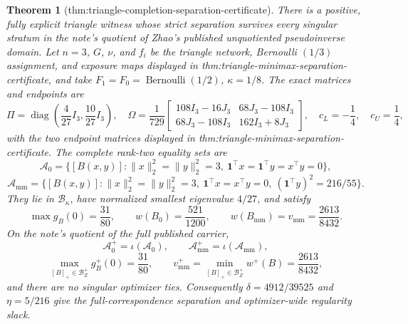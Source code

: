\documentclass{article}
\newtheorem{theorem}{Theorem}
\begin{document}
\begin{theorem}[thm:triangle-completion-separation-certificate]\label{thm:triangle-completion-separation-certificate}
There is a positive, fully explicit triangle witness whose strict separation survives every singular stratum in the note's quotient of Zhao's published unquotiented pseudoinverse domain.  Let \(n=3\), \(G\), \(\nu\), and \(f_i\) be the triangle network, Bernoulli \((1/3)\) assignment, and exposure maps displayed in thm:triangle-minimax-separation-certificate, and take \(F_1=F_0=\operatorname{Bernoulli}(1/2)\), \(\kappa=1/8\).  The exact matrices and endpoints are
\[
\Pi=\operatorname{diag}\!\left(\frac4{27}I_3,\frac{10}{27}I_3\right),
\quad
\Omega=\frac1{729}
\begin{bmatrix}108I_3-16J_3&68J_3-108I_3\\68J_3-108I_3&162I_3+8J_3\end{bmatrix},
\quad c_L=-\frac14,\quad c_U=\frac14,
\]
with the two endpoint matrices displayed in thm:triangle-minimax-separation-certificate.  The complete rank-two equality sets are
\[
\mathcal A_0=\{[B(x,y)]:\lVert x\rVert_2^2=\lVert y\rVert_2^2=3,
\ \mathbf1^\top x=\mathbf1^\top y=x^\top y=0\},
\]
\[
\mathcal A_{\mathrm{mm}}=\{[B(x,y)]:\lVert x\rVert_2^2=\lVert y\rVert_2^2=3,
\ \mathbf1^\top x=x^\top y=0,\ (\mathbf1^\top y)^2=216/55\}.
\]
They lie in \(\mathcal B_\kappa\), have normalized smallest eigenvalue \(4/27\), and satisfy
\[
\max g_B(0)=\frac{31}{80},
\qquad w(B_0)=\frac{521}{1200},
\qquad w(B_{\mathrm{mm}})=v_{\mathrm{mm}}=\frac{2613}{8432}.
\]
On the note's quotient of the full published carrier,
\[
\mathcal A_0^+=\iota(\mathcal A_0),
\qquad \mathcal A_{\mathrm{mm}}^+=\iota(\mathcal A_{\mathrm{mm}}),
\]
\[
\max_{[B]_+\in\mathcal B_Z^+}g_B^+(0)=\frac{31}{80},
\qquad v_{\mathrm{mm}}^+=\min_{[B]_+\in\mathcal B_Z^+}w^+(B)=\frac{2613}{8432},
\]
and there are no singular optimizer ties.  Consequently \(\delta=4912/39525\) and \(\eta=5/216\) give the full-correspondence separation and optimizer-wide regularity slack.
\end{theorem}
\end{document}

